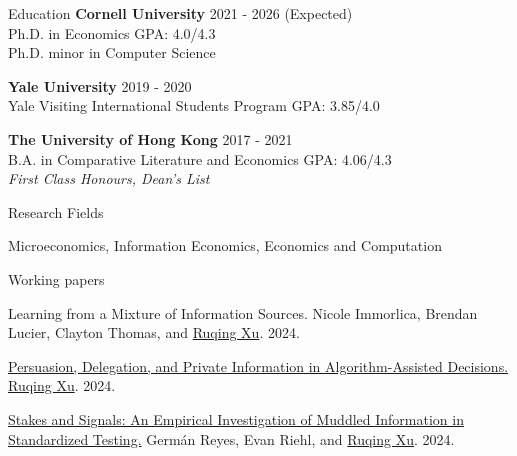 \documentclass{resume} %
\begin{document}

\begin{rSection}{Education}
{\bf Cornell University} \hfill {2021 - 2026 (Expected)} 
\\ Ph.D. in Economics \hfill {GPA: 4.0/4.3} \\
Ph.D. minor in Computer Science \hfill 

{\bf Yale University} \hfill {2019 - 2020} 
\\ Yale Visiting International Students Program \hfill {GPA: 3.85/4.0}

{\bf The University of Hong Kong} \hfill {2017 - 2021} 
\\ B.A. in Comparative Literature and Economics \hfill {GPA: 4.06/4.3}
\\ \emph{First Class Honours, Dean's List}

\end{rSection}

\begin{rSection}{Research Fields} \itemsep -10pt
\item Microeconomics, Information Economics, Economics and Computation
\end{rSection}

\begin{rSection}{Working papers}

Learning from a Mixture of Information Sources. Nicole Immorlica, Brendan Lucier, Clayton Thomas, and \underline{Ruqing Xu}. 2024.

\href{https://ruqing-xu.github.io/assets/pdf/delegation_xu.pdf}{Persuasion, Delegation, and Private Information in Algorithm-Assisted Decisions.} \underline{Ruqing Xu}. 2024.

\href{https://ruqing-xu.github.io/assets/pdf/rrx_stakes_june2024.pdf}{Stakes and Signals: An Empirical Investigation of Muddled
Information in Standardized Testing.} Germán Reyes, Evan Riehl, and \underline{Ruqing Xu}. 2024.



\end{rSection}
\end{document}

